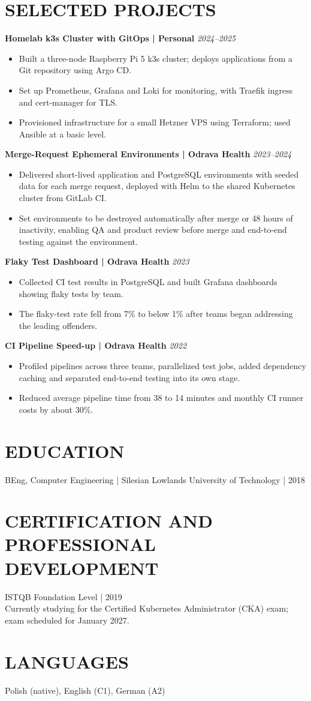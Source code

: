 \documentclass[11pt,a4paper]{article}
\begin{document}
\section*{SELECTED PROJECTS}
\textbf{Homelab k3s Cluster with GitOps | Personal} \hfill \textit{2024–2025}
\begin{itemize}
\item Built a three-node Raspberry Pi 5 k3s cluster; deploys applications from a Git repository using Argo CD.
\item Set up Prometheus, Grafana and Loki for monitoring, with Traefik ingress and cert-manager for TLS.
\item Provisioned infrastructure for a small Hetzner VPS using Terraform; used Ansible at a basic level.
\end{itemize}

\textbf{Merge-Request Ephemeral Environments | Odrava Health} \hfill \textit{2023–2024}
\begin{itemize}
\item Delivered short-lived application and PostgreSQL environments with seeded data for each merge request, deployed with Helm to the shared Kubernetes cluster from GitLab CI.
\item Set environments to be destroyed automatically after merge or 48 hours of inactivity, enabling QA and product review before merge and end-to-end testing against the environment.
\end{itemize}

\textbf{Flaky Test Dashboard | Odrava Health} \hfill \textit{2023}
\begin{itemize}
\item Collected CI test results in PostgreSQL and built Grafana dashboards showing flaky tests by team.
\item The flaky-test rate fell from 7\% to below 1\% after teams began addressing the leading offenders.
\end{itemize}

\textbf{CI Pipeline Speed-up | Odrava Health} \hfill \textit{2022}
\begin{itemize}
\item Profiled pipelines across three teams, parallelized test jobs, added dependency caching and separated end-to-end testing into its own stage.
\item Reduced average pipeline time from 38 to 14 minutes and monthly CI runner costs by about 30\%.
\end{itemize}

\section*{EDUCATION}
BEng, Computer Engineering | Silesian Lowlands University of Technology | 2018

\section*{CERTIFICATION AND PROFESSIONAL DEVELOPMENT}
ISTQB Foundation Level | 2019\\
Currently studying for the Certified Kubernetes Administrator (CKA) exam; exam scheduled for January 2027.

\section*{LANGUAGES}
Polish (native), English (C1), German (A2)
\end{document}
